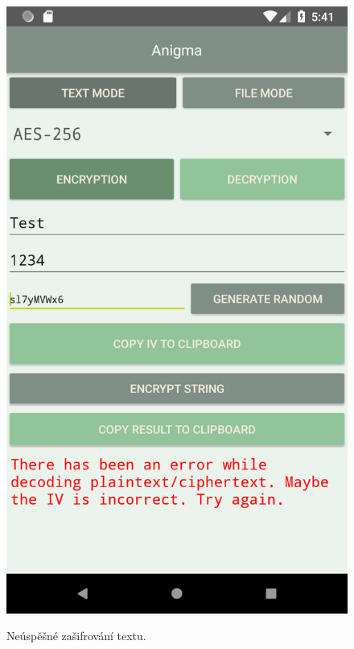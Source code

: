 \documentclass[12pt, a4paper]{article}
\begin{document}
\begin{figure}[h]
\caption{Neúspěšné zašifrování textu.}
\centering
\includegraphics[height=0.4\textheight]{text_enc_error}
\label{fig:text_enc_error}
\end{figure}
\end{document}
